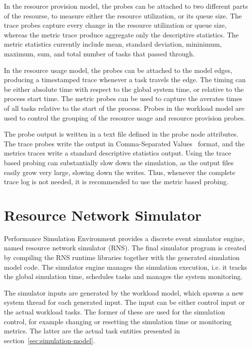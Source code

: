 In the resource provision model, the probes can be attached to two different parts of the resourse, to measure either the resource utilization, or its queue size. The trace probes capture every change in the resource utilization or queue size, whereas the metric trace produce aggregate only the descriptive statistics. The metric statistics currently include mean, standard deviation, mininimum, maximum, sum, and total number of tasks that passed through.

In the resource usage model, the probes can be attached to the model edges, producing a timestamped trace whenever a task travels the edge. The timing can be either absolute time with respect to the global system time, or relative to the process start time. The metric probes can be used to capture the averates times of all tasks relative to the start of the process. Probes in the workload model are used to control the grouping of the resource usage and resource provision probes.

The probe output is written in a text file defined in the probe node attributes. The trace probes write the output in Comma-Separated Values~\cite{https://tools.ietf.org/html/rfc4180} format, and the metrics traces write a standard descriptive statistics output. Using the trace based probing can substantially slow down the simulation, as the output files easily grow very large, slowing down the writes. Thus, whenever the complete trace log is not needed, it is recommended to use the metric based probing.


\section{Resource Network Simulator}
\label{sec:resource-network-simulator}

Performance Simulation Environment provides a discrete event simulator engine, named resource network simulator (RNS). The final simulator program is created by compiling the RNS runtime libraries together with the generated simulation model code. The simulator engine manages the simulation execution, i.e. it tracks the global simulation time, schedules tasks and manages the system monitoring.

The simulator inputs are generated by the workload model, which spawns a new system thread for each generated input. The input can be either control input or the actual workload tasks. The former of these are used for the simulation control, for example changing or resetting the simulation time or monitoring metrics. The latter are the actual task entities presented in section~\ref{sec:simulation-model}.

